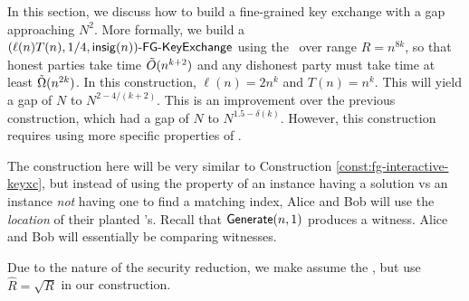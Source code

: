 In this section, we discuss how to build a fine-grained key exchange with a gap approaching $N^2$. More formally, we build a $\fgkeyxc{\ell(n)T(n)}{1/4}{\insig(n)}$ using the \strongzkc~over range $R = n^{8k}$, so that honest parties take time $\~O(n^{k+2})$ and any dishonest party must take time at least $\~\Omega(n^{2k})$. In this construction, $\ell(n) = 2n^k$ and $T(n) = n^k$. This will yield a gap of $N$ to $N^{2 - 4/(k+2)}$. This is an improvement over the previous construction, which had a gap of $N$ to $N^{1.5 - \delta(k)}$. However, this construction requires using more specific properties of \zkclique.

The construction here will be very similar to Construction \ref{const:fg-interactive-keyxc}, but instead of using the property of an instance having a solution vs an instance \emph{not} having one to find a matching index, Alice and Bob will use the \emph{location} of their planted \zkclique's. Recall that $\Generate(n,1)$ produces a witness. Alice and Bob will essentially be comparing witnesses.

Due to the nature of the security reduction, we make assume the \strongzkc, but use $\hat R = \sqrt R$ in our construction.

